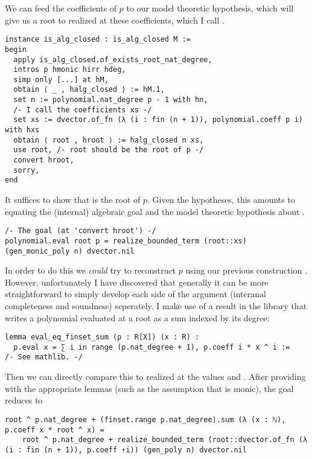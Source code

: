 We can feed the coefficients of $p$ to our model theoretic hypothesis,
which will give us a root to 
realized at these coefficients, which I call .

\begin{lstlisting}
instance is_alg_closed : is_alg_closed M :=
begin
  apply is_alg_closed.of_exists_root_nat_degree,
  intros p hmonic hirr hdeg,
  simp only [...] at hM,
  obtain ⟨ _ , halg_closed ⟩ := hM.1,
  set n := polynomial.nat_degree p - 1 with hn,
  /- I call the coefficients xs -/
  set xs := dvector.of_fn (λ (i : fin (n + 1)), polynomial.coeff p i) with hxs
  obtain ⟨ root , hroot ⟩ := halg_closed n xs,
  use root, /- root should be the root of p -/
  convert hroot,
  sorry,
end
\end{lstlisting}

It suffices to show that  is the root of $p$.
Given the hypotheses, this amounts to equating the (internal) algebraic goal
and the model theoretic hypothesis  about .

\begin{lstlisting}
/- The goal (at 'convert hroot') -/
polynomial.eval root p = realize_bounded_term (root::xs) (gen_monic_poly n) dvector.nil\end{lstlisting}

In order to do this we \textit{could} try to reconstruct $p$
using our previous construction .
However, unfortunately I have discovered that generally it can be
more straightforward to simply develop each side of the argument
(interanal completeness and soundness) seperately.
I make use of a result in the library that writes a polynomial
evaluated at a root as a sum indexed by its degree:

\begin{lstlisting}
lemma eval_eq_finset_sum (p : R[X]) (x : R) :
  p.eval x = ∑ i in range (p.nat_degree + 1), p.coeff i * x ^ i :=
/- See mathlib. -/
\end{lstlisting}

Then we can directly compare this to  realized
at the values  and .
After providing  with the appropriate lemmas
(such as the assumption that  is monic),
the goal reduces to

\begin{lstlisting}
root ^ p.nat_degree + (finset.range p.nat_degree).sum (λ (x : ℕ), p.coeff x * root ^ x) =
    root ^ p.nat_degree + realize_bounded_term (root::dvector.of_fn (λ (i : fin (n + 1)), p.coeff ↑i)) (gen_poly n) dvector.nil\end{lstlisting}

